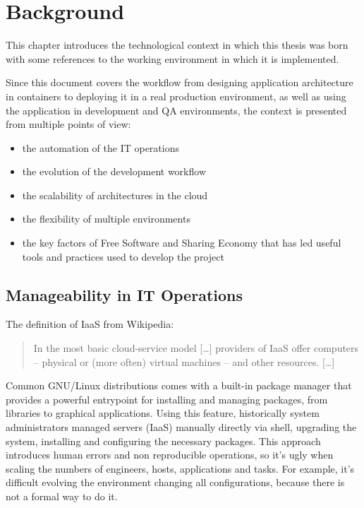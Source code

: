\chapter{Background}\label{background}

This chapter introduces the technological context in which this thesis was born with some references to the working environment in which it is implemented.

Since this document covers the workflow from designing application architecture in containers to deploying it in a real production environment, as well as using the application in development and QA environments, the context is presented from multiple points of view:

\begin{itemize}
\item the automation of the IT operations
\item the evolution of the development workflow
\item the scalability of architectures in the cloud
\item the flexibility of multiple environments
\item the key factors of Free Software and Sharing Economy that has led useful tools and practices used to develop the project
\end{itemize}

\section{Manageability in IT
Operations}\label{manageability-in-it-operations}

The definition of IaaS from Wikipedia\cite{CloudComputing}:

\begin{quote}
In the most basic cloud-service model {[}\ldots{}{]} providers of IaaS
offer computers -- physical or (more often) virtual machines -- and
other resources. {[}\ldots{}{]}
\end{quote}

Common GNU/Linux distributions comes with a built-in package manager
that provides a powerful entrypoint for installing and managing
packages, from libraries to graphical applications. Using this feature,
historically system administrators managed servers (IaaS)
manually directly via shell, upgrading the system, installing and
configuring the necessary packages. This approach introduces human
errors and non reproducible operations, so it's ugly when scaling
the numbers of engineers, hosts, applications and tasks. For example,
it's difficult evolving the environment changing all configurations,
because there is not a formal way to do it.

